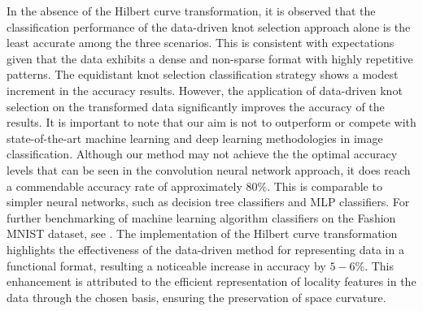  In the absence of the Hilbert curve transformation, it is observed that the classification performance of the data-driven knot selection approach alone is the least accurate among the three scenarios. This is consistent with expectations given that the data exhibits a dense and non-sparse format with highly repetitive patterns.
 The equidistant knot selection classification strategy shows a modest increment in the accuracy results. However, the application of data-driven knot selection on the transformed data significantly improves the accuracy of the results. It is important to note that our aim is not to outperform or compete with state-of-the-art machine learning and deep learning methodologies in image classification. 
 Although our method may not achieve the the optimal accuracy levels that can be seen in the convolution neural network approach, it does reach a commendable accuracy rate of approximately $80\%$. This is comparable to simpler neural networks, such as decision tree classifiers and MLP classifiers. For further benchmarking of machine learning algorithm classifiers on the Fashion MNIST dataset, see \citep{xiao2017fashion}. The implementation of the Hilbert curve transformation highlights the effectiveness of the data-driven method for representing data in a functional format, resulting a noticeable increase in accuracy by $5-6\%$. This enhancement is attributed to the efficient representation of locality features in the data through the chosen basis, ensuring the preservation of space curvature.
 
